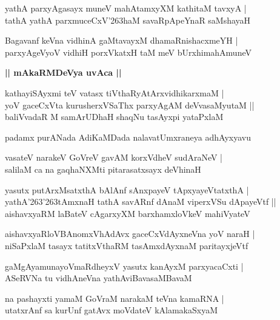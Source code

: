 \documentclass[twoside,12pt,openright]{book}
\def\S{\char'263}
\newcounter{shloka}[chapter]
\def\uvaca#1{\centerline{{\large\textbf{#1}}}}
\begin{document}
\begin{shloka}
yathA parxyAgasayx muneV mahAtamxyXM kathitaM tavxyA |\\
tathA yathA parxmuceCxV\S haM savaRpApeYnaR saMshayaH 
\end{shloka}

\begin{shloka}
Bagavanf keVna vidhinA gaMtavayxM dhamaRnishacxmeYH |\\
parxyAgeVyoV vidhiH porxVkatxH taM meV bUrxhimahAmuneV 
\end{shloka}

\uvaca{|| mAkaRMDeVya uvAca ||}

\begin{shloka}
kathayiSAyxmi teV vatasx tiVthaRyAtArxvidhikarxmaM |\\
yoV gaceCxVta kurusherxVSaThx parxyAgAM deVvasaMyutaM ||\\
baliVvadaR M samArUDhaH shaqNu tasAyxpi yataPxlaM 
\end{shloka}

\begin{center}
padamx purANada AdiKaMDada nalavatUmxraneya adhAyxyavu 
\end{center}

\begin{shloka}
vasateV narakeV GoVreV gavAM korxVdheV sudAraNeV |\\
salilaM ca na gaqhaNXMti pitarasatxsayx deVhinaH 
\end{shloka}

\begin{shloka}
yasutx putArxMsatxthA bAlAnf sAnxpayeV tApxyayeVtatxthA |\\
yathA\S\S tAmxnaH tathA savARnf dAnaM viperxVSu dApayeVtf ||\\
aishavxyaRM laBateV cAgarxyXM barxhamxloVkeV mahiVyateV 
\end{shloka}

\begin{shloka}
aishavxyaRloVBAnomxVhAdAvx gaceCxVdAyxneVna yoV naraH |\\
niSaPxlaM tasayx tatitxVthaRM tasAmxdAyxnaM paritayxjeVtf 
\end{shloka}

\begin{shloka}
gaMgAyamunayoVmaRdheyxV yasutx kanAyxM parxyacaCxti |\\
ASeRVNa tu vidhAneVna yathAviBavasaMBavaM 
\end{shloka}

\begin{shloka}
na pashayxti yamaM GoVraM narakaM teVna kamaRNA |\\
utatxrAnf sa kurUnf gatAvx moVdateV kAlamakaSxyaM 
\end{shloka}
\end{document}
